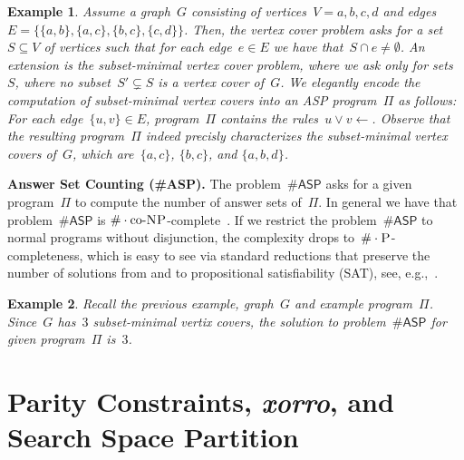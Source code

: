 \documentclass{article}
\newtheorem{example}{Example}
\def\asp{\textsf{\#ASP}\xspace}
\def\SAT{\textsf{SAT}\xspace}
\renewcommand{\P}{\ensuremath{\textsc{P}}\xspace}
\newcommand{\coNP}{\ensuremath{\text{co-}\textsc{NP}}\xspace}
\newcommand{\cnt}[0]{\ensuremath{\#}}
\newcommand{\cntc}[0]{\ensuremath{\cnt\cdot}}
\begin{document}

\begin{example}
Assume a graph~$G$ consisting of vertices~$V=a,b,c,d$
and edges~$E=\{\{a,b\}, \{a,c\}, \{b,c\}, \{c,d\}\}$.
Then, the \emph{vertex cover problem} asks for a set~$S\subseteq V$ of vertices
such that for each edge~$e\in E$ we have that~$S\cap e\neq \emptyset$.
An extension is the \emph{subset-minimal vertex cover problem}, where we ask
only for sets~$S$, where no subset~$S'\subsetneq S$ is a vertex cover of~$G$.
We elegantly encode the computation of subset-minimal vertex covers into an ASP program~$\Pi$ as follows:
For each edge~$\{u,v\}\in E$, program~$\Pi$ contains the rules~$u \vee v \leftarrow$.
Observe that the resulting program~$\Pi$ indeed precisly characterizes the subset-minimal vertex covers of~$G$, which are~$\{a,c\}$, $\{b,c\}$, and $\{a,b,d\}$.
\end{example}

\noindent\textbf{Answer Set Counting (\asp).}
The problem~$\asp$ asks for a given program~$\Pi$ to compute the number of
answer sets of~$\Pi$.
In general we have that problem~$\asp$ is
$\cntc\coNP$-complete~\cite{FichteEtAl17}.
If we restrict the problem~$\asp$ to normal programs without disjunction,
the complexity drops to~$\cntc\P$-completeness,
which is easy to see via standard reductions
that preserve the number of solutions from and to propositional satisfiability (\SAT), see, e.g.,~\cite{Janhunen06}.

\begin{example}
Recall the previous example, graph~$G$ and example program~$\Pi$.
Since~$G$ has~$3$ subset-minimal vertix covers, the solution to problem~$\asp$
for given program~$\Pi$ is~$3$.
\end{example}


\section{Parity Constraints, \emph{xorro}, and Search Space Partition} \label{sec:parity}
\end{document}
